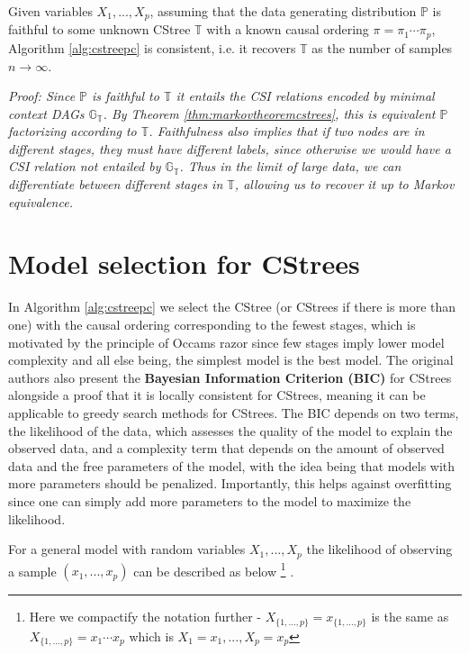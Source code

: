 \documentclass{tufte-book}
\begin{document}
\begin{Definition}
\begin{theorem}\label{thm:cstreepccorrectness}
Given variables $X_1,...,X_p$, assuming that the data generating distribution $\mathbb{P}$ is faithful to some unknown CStree $\mathbb{T}$ with a known causal ordering $\pi = \pi_1 \cdots \pi_p$, Algorithm \ref{alg:cstreepc} is consistent, i.e. it recovers $\mathbb{T}$ as the number of samples $n \rightarrow \infty$.
\end{theorem}


\textit{Proof:
Since $\mathbb{P}$ is faithful to $\mathbb{T}$ it entails the CSI relations encoded by minimal context DAGs $\mathbb{G}_{\mathbb{T}}$. By Theorem \ref{thm:markovtheoremcstrees}, this is equivalent $\mathbb{P}$ factorizing according to $\mathbb{T}$. Faithfulness also implies that if two nodes are in different stages, they must have different labels, since otherwise we would have a CSI relation not entailed by $\mathbb{G}_{\mathbb{T}}$. Thus in the limit of large data, we can differentiate between different stages in $\mathbb{T}$, allowing us to recover it up to Markov equivalence.
}

\section{Model selection for CStrees}
\label{sec:org925c218}
In Algorithm \ref{alg:cstreepc} we select the CStree (or CStrees if there is more than one) with the causal ordering corresponding to the fewest stages, which is motivated by the principle of Occams razor \cite{pearl-2009-causal} since few stages imply lower model complexity and all else being, the simplest model is the best model. The original authors also present the \textbf{Bayesian Information Criterion (BIC)} for CStrees alongside a proof that it is locally consistent for CStrees, meaning it can be applicable to greedy search methods for CStrees. The BIC depends on two terms, the likelihood of the data, which assesses the quality of the model to explain the observed data, and a complexity term that depends on the amount of observed data and the free parameters of the model, with the idea being that models with more parameters should be penalized. Importantly, this helps against overfitting since one can simply add more parameters to the model to maximize the likelihood.


For a general model with random variables \(X_1,...,X_p\) the likelihood of observing a sample \((x_1,...,x_p)\) can be described as below  \footnote{Here we compactify the notation further - $X_{\{1,...,p\}}=x_{\{1,...,p\}}$ is the same as $X_{\{1,...,p\}}=x_1\cdots x_p$ which is $X_1=x_1,...,X_p=x_p$} 
.



\end{Definition}
\end{document}
